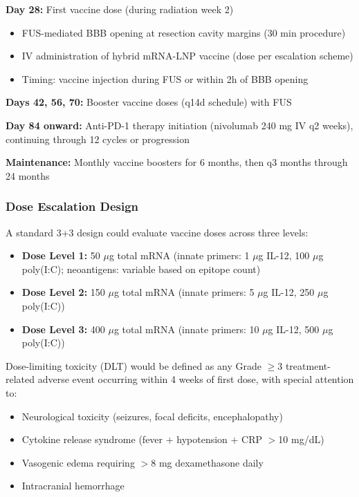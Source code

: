 \documentclass[12pt]{article}
\begin{document}
\textbf{Day 28:} First vaccine dose (during radiation week 2)
\begin{itemize}[leftmargin=*,noitemsep]
\item FUS-mediated BBB opening at resection cavity margins (30 min procedure)
\item IV administration of hybrid mRNA-LNP vaccine (dose per escalation scheme)
\item Timing: vaccine injection during FUS or within 2h of BBB opening
\end{itemize}

\textbf{Days 42, 56, 70:} Booster vaccine doses (q14d schedule) with FUS

\textbf{Day 84 onward:} Anti-PD-1 therapy initiation (nivolumab 240 mg IV q2 weeks), continuing through 12 cycles or progression

\textbf{Maintenance:} Monthly vaccine boosters for 6 months, then q3 months through 24 months

\subsubsection{Dose Escalation Design}
A standard 3+3 design could evaluate vaccine doses across three levels:

\begin{itemize}[leftmargin=*,noitemsep]
\item \textbf{Dose Level 1:} 50 $\mu$g total mRNA (innate primers: 1 $\mu$g IL-12, 100 $\mu$g poly(I:C); neoantigens: variable based on epitope count)
\item \textbf{Dose Level 2:} 150 $\mu$g total mRNA (innate primers: 5 $\mu$g IL-12, 250 $\mu$g poly(I:C))
\item \textbf{Dose Level 3:} 400 $\mu$g total mRNA (innate primers: 10 $\mu$g IL-12, 500 $\mu$g poly(I:C))
\end{itemize}

Dose-limiting toxicity (DLT) would be defined as any Grade $\geq$3 treatment-related adverse event occurring within 4 weeks of first dose, with special attention to:
\begin{itemize}[leftmargin=*,noitemsep]
\item Neurological toxicity (seizures, focal deficits, encephalopathy)
\item Cytokine release syndrome (fever + hypotension + CRP $>$10 mg/dL)
\item Vasogenic edema requiring $>$8 mg dexamethasone daily
\item Intracranial hemorrhage
\end{itemize}
\end{document}
